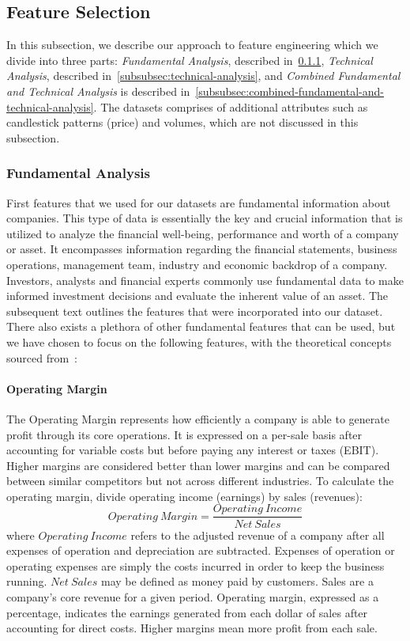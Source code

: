 \documentclass[../xlapes02]{subfiles}
\begin{document}
    \subsection{Feature Selection}\label{sec:feature-selection}
    In this subsection, we describe our approach to feature engineering which we divide into three parts: \emph{Fundamental Analysis}, described in~\cref{subsubsec:fundamental-analysis}, \emph{Technical Analysis}, described in~\cref{subsubsec:technical-analysis}, and \emph{Combined Fundamental and Technical Analysis} is described in~\cref{subsubsec:combined-fundamental-and-technical-analysis}. The datasets comprises of additional attributes such as candlestick patterns (price) and volumes, which are not discussed in this subsection.

    \subsubsection{Fundamental Analysis}\label{subsubsec:fundamental-analysis}
    First features that we used for our datasets are fundamental information about companies. This type of data is essentially the key and crucial information that is utilized to analyze the financial well-being, performance and worth of a company or asset. It encompasses information regarding the financial statements, business operations, management team, industry and economic backdrop of a company. Investors, analysts and financial experts commonly use fundamental data to make informed investment decisions and evaluate the inherent value of an asset. The subsequent text outlines the features that were incorporated into our dataset. There also exists a plethora of other fundamental features that can be used, but we have chosen to focus on the following features, with the theoretical concepts sourced from~\cite{investopedia}:

    \paragraph{Operating Margin}\label{par:operating-margin}
    The Operating Margin represents how efficiently a company is able to generate profit through its core operations. It is expressed on a per-sale basis after accounting for variable costs but before paying any interest or taxes (EBIT). Higher margins are considered better than lower margins and can be compared between similar competitors but not across different industries. To calculate the operating margin, divide operating income (earnings) by sales (revenues):
    \begin{equation}
        Operating\ Margin=\frac{Operating\ Income}{Net\ Sales}
    \end{equation}
    where $Operating\ Income$ refers to the adjusted revenue of a company after all expenses of operation and depreciation are subtracted. Expenses of operation or operating expenses are simply the costs incurred in order to keep the business running. $Net\ Sales$ may be defined as money paid by customers. Sales are a company's core revenue for a given period. Operating margin, expressed as a percentage, indicates the earnings generated from each dollar of sales after accounting for direct costs. Higher margins mean more profit from each sale.
\end{document}
